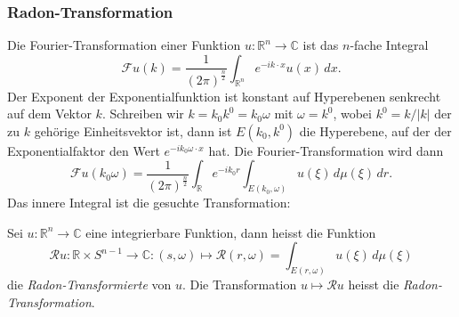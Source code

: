 %
%
\subsubsection{Radon-Transformation}
Die Fourier-Transformation einer Funktion $u\colon \mathbb{R}^n\to\mathbb{C}$
ist das $n$-fache Integral
\[
\mathscr{F}u(k)
=
\frac{1}{(2\pi)^{\frac{n}2}}
\int_{\mathbb{R}^n}
e^{-ik\cdot x} u(x)\,dx.
\]
Der Exponent der Exponentialfunktion ist konstant auf Hyperebenen senkrecht
auf dem Vektor $k$.
Schreiben wir $k=k_0k^0=k_0\omega$ mit $\omega=k^0$, wobei $k^0=k/|k|$ der
zu $k$ gehörige Einheitsvektor ist, dann ist 
$E(k_0,k^0)$ die Hyperebene, auf der der Exponentialfaktor den
Wert $e^{-ik_0\omega\cdot x}$ hat.
Die Fourier-Transformation wird dann
\[
\mathscr{F}u(k_0\omega)
=
\frac{1}{(2\pi)^{\frac{n}2}}
\int_{\mathbb{R}}
e^{-ik_0r}
\int_{E(k_0,\omega)}
u(\xi)
\,d\mu(\xi)
\,dr.
\]
Das innere Integral ist die gesuchte Transformation:

\begin{definition}
Sei $u\colon\mathbb{R}^n\to\mathbb{C}$ eine integrierbare Funktion,
dann heisst die Funktion
\[
\mathscr{R}u
\colon
\mathbb{R}\times S^{n-1}
\to
\mathbb{C}
:
(s,\omega)
\mapsto
\mathscr{R}(r,\omega)
=
\int_{E(r,\omega)} u(\xi) \,d\mu(\xi)
\]
die {\em Radon-Transformierte} von $u$.
%
Die Transformation $u\mapsto \mathscr{R}u$ heisst die
{\em Radon-Transformation}.
%
\end{definition}

%
%
